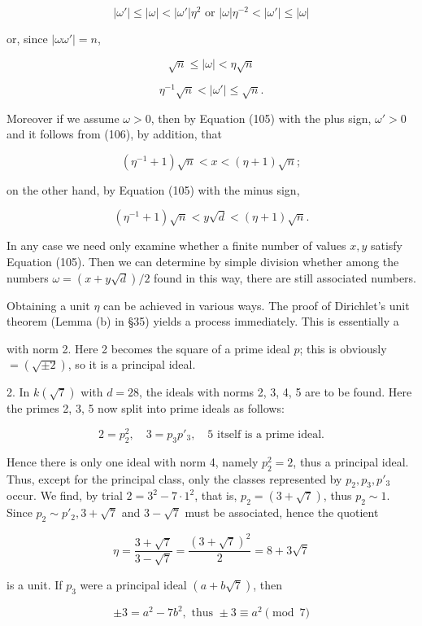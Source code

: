 $$|\omega'| \leq |\omega| < |\omega'|\eta^2 \text{ or } |\omega| \eta^{-2} < |\omega'| \leq |\omega|$$

or, since $|\omega\omega'| = n$,

$$\sqrt{n} \leq |\omega| < \eta\sqrt{n}$$

$$\eta^{-1}\sqrt{n} < |\omega'| \leq \sqrt{n}. \tag{106}$$

Moreover if we assume $\omega > 0$, then by Equation (105) with the plus sign, $\omega' > 0$ and it follows from (106), by addition, that

$$(\eta^{-1} + 1)\sqrt{n} < x < (\eta + 1)\sqrt{n}; \tag{107}$$

on the other hand, by Equation (105) with the minus sign,

$$(\eta^{-1} + 1)\sqrt{n} < y\sqrt{d} < (\eta + 1)\sqrt{n}. \tag{108}$$

In any case we need only examine whether a finite number of values $x, y$ satisfy Equation (105). Then we can determine by simple division whether among the numbers $\omega = (x + y\sqrt{d})/2$ found in this way, there are still associated numbers.

Obtaining a unit $\eta$ can be achieved in various ways. The proof of Dirichlet’s unit theorem (Lemma (b) in §35) yields a process immediately. This is essentially a

with norm 2. Here 2 becomes the square of a prime ideal $p$; this is obviously $= (\sqrt{\pm 2})$, so it is a principal ideal.

2. In $k(\sqrt{7})$ with $d = 28$, the ideals with norms 2, 3, 4, 5 are to be found. Here the primes 2, 3, 5 now split into prime ideals as follows:

$$2 = p_2^2, \quad 3 = p_3p'_3, \quad 5 \text{ itself is a prime ideal.}$$

Hence there is only one ideal with norm 4, namely $p_2^2 = 2$, thus a principal ideal. Thus, except for the principal class, only the classes represented by $p_2, p_3, p'_3$ occur. We find, by trial $2 = 3^2 - 7 \cdot 1^2$, that is, $p_2 = (3 + \sqrt{7})$, thus $p_2 \sim 1$. Since $p_2 \sim p'_2, 3 + \sqrt{7}$ and $3 - \sqrt{7}$ must be associated, hence the quotient

$$\eta = \frac{3 + \sqrt{7}}{3 - \sqrt{7}} = \frac{(3 + \sqrt{7})^2}{2} = 8 + 3\sqrt{7}$$

is a unit. If $p_3$ were a principal ideal $(a + b\sqrt{7})$, then

$$\pm 3 = a^2 - 7b^2, \text{ thus } \pm 3 \equiv a^2 \pmod{7}$$

